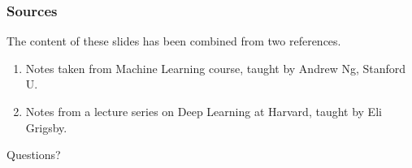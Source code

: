 \documentclass{beamer}
\theoremstyle{example}
\begin{document}
\begin{frame}
    \frametitle{Sources}
    The content of these slides has been combined from two references. 

    \begin{enumerate}
        \item Notes taken from Machine Learning course, taught by Andrew Ng, Stanford U.
        \item Notes from a lecture series on Deep Learning at Harvard, taught by Eli Grigsby.
    \end{enumerate}

    \vfill
\end{frame}

{
\begin{frame}[standout]
    Questions?
\end{frame}
}
\end{document}
